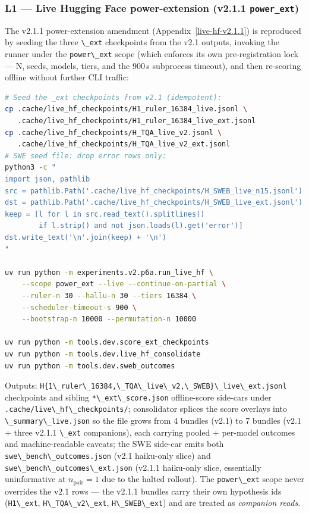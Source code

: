 \subsubsection{L1 --- Live Hugging Face power-extension (v2.1.1
\texttt{power\_ext})}\label{l1-live-hf-rerun-power-ext}

The v2.1.1 power-extension amendment (Appendix~\ref{live-hf-v2.1.1})
is reproduced by seeding the three \passthrough{\lstinline!\_ext!}
checkpoints from the v2.1 outputs, invoking the runner under the
\passthrough{\lstinline!power\_ext!} scope (which enforces its own
pre-registration lock --- N, seeds, models, tiers, and the 900\,s
subprocess timeout), and then re-scoring offline without further
CLI traffic:

\begin{lstlisting}[language=bash]
# Seed the _ext checkpoints from v2.1 (idempotent):
cp .cache/live_hf_checkpoints/H1_ruler_16384_live.jsonl \
   .cache/live_hf_checkpoints/H1_ruler_16384_live_ext.jsonl
cp .cache/live_hf_checkpoints/H_TQA_live_v2.jsonl \
   .cache/live_hf_checkpoints/H_TQA_live_v2_ext.jsonl
# SWE seed file: drop error rows only:
python3 -c "
import json, pathlib
src = pathlib.Path('.cache/live_hf_checkpoints/H_SWEB_live_n15.jsonl')
dst = pathlib.Path('.cache/live_hf_checkpoints/H_SWEB_live_ext.jsonl')
keep = [l for l in src.read_text().splitlines()
        if l.strip() and not json.loads(l).get('error')]
dst.write_text('\n'.join(keep) + '\n')
"

uv run python -m experiments.v2.p6a.run_live_hf \
    --scope power_ext --live --continue-on-partial \
    --ruler-n 30 --hallu-n 30 --tiers 16384 \
    --scheduler-timeout-s 900 \
    --bootstrap-n 10000 --permutation-n 10000

uv run python -m tools.dev.score_ext_checkpoints
uv run python -m tools.dev.live_hf_consolidate
uv run python -m tools.dev.sweb_outcomes
\end{lstlisting}

Outputs: \passthrough{\lstinline!H\{1\_ruler\_16384,\_TQA\_live\_v2,\_SWEB\}\_live\_ext.jsonl!}
checkpoints and sibling \passthrough{\lstinline!*\_ext\_score.json!}
offline-score side-cars under \passthrough{\lstinline!.cache/live\_hf\_checkpoints/!};
consolidator splices the score overlays into
\passthrough{\lstinline!\_summary\_live.json!} so the file grows
from 4 bundles (v2.1) to 7 bundles (v2.1 + three v2.1.1
\passthrough{\lstinline!\_ext!} companions), each carrying pooled
+ per-model outcomes and machine-readable caveats; the SWE
side-car emits both \passthrough{\lstinline!swe\_bench\_outcomes.json!}
(v2.1 haiku-only slice) and
\passthrough{\lstinline!swe\_bench\_outcomes\_ext.json!}
(v2.1.1 haiku-only slice, essentially uninformative at
$n_\text{pair}=1$ due to the halted rollout). The
\passthrough{\lstinline!power\_ext!} scope never overrides the
v2.1 rows --- the v2.1.1 bundles carry their own hypothesis ids
(\passthrough{\lstinline!H1\_ext!}, \passthrough{\lstinline!H\_TQA\_v2\_ext!},
\passthrough{\lstinline!H\_SWEB\_ext!}) and are treated as
\emph{companion reads}.

